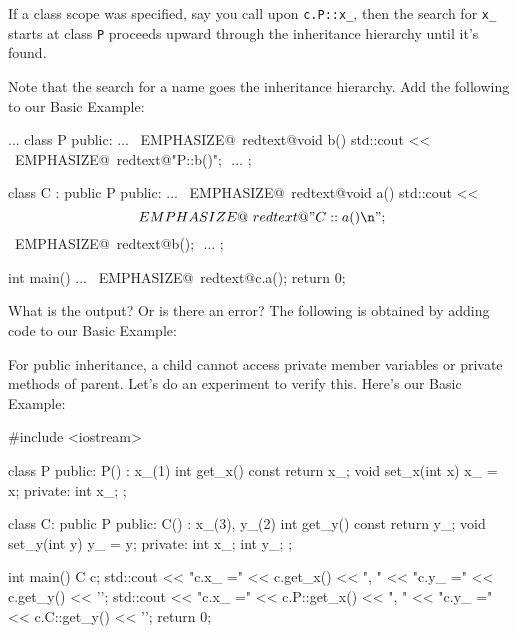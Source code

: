 If a class scope was specified, say you call upon \verb!c.P::x_!, then
the search for \verb!x_! starts at class \verb!P! proceeds upward
through the inheritance hierarchy until it's found.

Note that the search for a name goes  the inheritance
hierarchy. Add the following to our Basic Example:
\begin{console}[commandchars=\~\@\$]
...
class P
{
public:
        ...
        ~EMPHASIZE@~redtext@void b() { std::cout <<$$ 
                   ~EMPHASIZE@~redtext@"P::b()\n"; }$$
        ...
};

class C : public P
{
public:
        ...
        ~EMPHASIZE@~redtext@void a() { std::cout <<$$ 
                   ~EMPHASIZE@~redtext@"C::a()\n";$$
                   ~EMPHASIZE@~redtext@b();  }$$
        ...
};

int main()
{   
    ...
    ~EMPHASIZE@~redtext@c.a();$$
    return 0;
}
\end{console}

\begin{ex} What is the output? Or is there an error? The
following is obtained by adding code to our Basic Example:
\end{ex}
\newpage{}

For public inheritance, a child cannot access private member variables
or private methods of parent. Let's do an experiment to verify this.
Here's our Basic Example:
\begin{console}
#include <iostream>

class P
{
public:
        P() : x_(1) {}
        int get_x() const { return x_; }
        void set_x(int x) { x_ = x; }
private:
        int x_;
};

class C: public P
{
public:
        C() : x_(3), y_(2) {}
        int get_y() const { return y_; }
        void set_y(int y) { y_ = y; }
private:
        int x_;
        int y_;
};

int main()
{   
    C c;
    std::cout << "c.x_ =" << c.get_x() << ", "
              << "c.y_ =" << c.get_y() << '\n';
    std::cout << "c.x_ =" << c.P::get_x() << ", "
              << "c.y_ =" << c.C::get_y() << '\n';
return 0;
}
\end{console}

